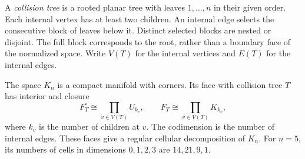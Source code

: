 A \emph{collision tree} is a rooted planar tree with leaves
\(1,\ldots,n\) in their given order.  Each internal vertex has
at least two children.  An internal edge selects the consecutive
block of leaves below it.  Distinct selected blocks are nested or
disjoint.  The full block corresponds to the root, rather than a
boundary face of the normalized space.
Write \(V(T)\) for the internal vertices and \(E(T)\) for
the internal edges.

\begin{proposition}\label{gf:prop:gf-strata}
The space \(K_n\) is a compact manifold with corners.
Its face with collision tree \(T\) has interior and closure
\begin{equation}\label{gf:eq:gf-stratum-product}
 F_T^\circ\cong\prod_{v\in V(T)}U_{k_v},\qquad
 F_T\cong\prod_{v\in V(T)}K_{k_v},
\end{equation}
where \(k_v\) is the number of children at \(v\).
The codimension is the number of internal edges.
These faces give a regular cellular decomposition of \(K_n\).
For \(n=5\), its numbers of cells in dimensions \(0,1,2,3\)
are \(14,21,9,1\).
\end{proposition}

